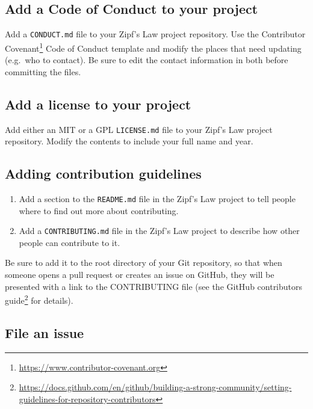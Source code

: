 \documentclass[
]{krantz}
\renewcommand{\href}[2]{#2\footnote{\url{#1}}}
\begin{document}
\hypertarget{teams-ex-boilerplate-coc}{%
\subsection{Add a Code of Conduct to your project}\label{teams-ex-boilerplate-coc}}

Add a \texttt{CONDUCT.md} file to your Zipf's Law project repository.
Use the \href{https://www.contributor-covenant.org}{Contributor Covenant} Code of Conduct template and modify the
places that need updating (e.g.~who to contact).
Be sure to edit the contact information in both before committing the files.

\hypertarget{teams-ex-boilerplate-license}{%
\subsection{Add a license to your project}\label{teams-ex-boilerplate-license}}

Add either an MIT or a GPL \texttt{LICENSE.md} file to your Zipf's Law project
repository.
Modify the contents to include your full name and year.

\hypertarget{teams-ex-contributing}{%
\subsection{Adding contribution guidelines}\label{teams-ex-contributing}}

\begin{enumerate}
\def\labelenumi{\arabic{enumi}.}
\item
  Add a section to the \texttt{README.md} file in the Zipf's Law project
  to tell people where to find out more about contributing.
\item
  Add a \texttt{CONTRIBUTING.md} file in the Zipf's Law project
  to describe how other people can contribute to it.
\end{enumerate}

Be sure to add it to the root directory of your Git repository,
so that when someone opens a pull request or creates an issue on GitHub,
they will be presented with a link to the CONTRIBUTING file
(see the \href{https://docs.github.com/en/github/building-a-strong-community/setting-guidelines-for-repository-contributors}{GitHub contributors guide} for details).

\hypertarget{teams-ex-file-issue}{%
\subsection{File an issue}\label{teams-ex-file-issue}}
\end{document}
